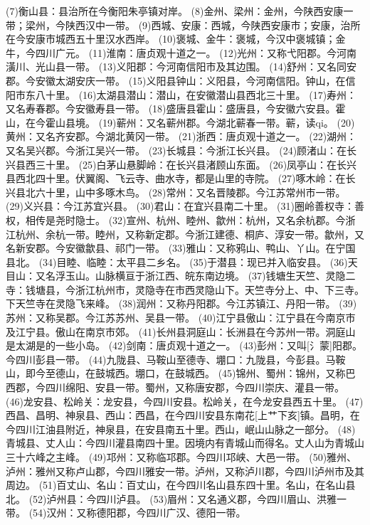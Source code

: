 \documentclass[12pt,UTF8]{ctexbook}
\begin{document}
(7)衡山县：县治所在今衡阳朱亭镇对岸。
(8)金州、梁州：金州，今陕西安康一带；梁州，今陕西汉中一带。
(9)西城、安康：西城，今陕西安康市；安康，治所在今安康市城西五十里汉水西岸。
(10)褒城、金牛：褒城，今汉中褒城镇；金牛，今四川广元。
(11)淮南：唐贞观十道之一。
(12)光州：又称弋阳郡。今河南潢川、光山县一带。
(13)义阳郡：今河南信阳市及其边围。
(14)舒州：又名同安郡。今安徽太湖安庆一带。
(15)义阳县钟山：义阳县，今河南信阳。钟山，在信阳市东八十里。
(16)太湖县潜山：潜山，在安徽潜山县西北三十里。
(17)寿州：又名寿春郡。今安徽寿县一带。
(18)盛唐县霍山：盛唐县，今安徽六安县。霍山，在今霍山县境。
(19)蕲州：又名蕲州郡。今湖北蕲春一带。蕲，读qi。
(20)黄州：又名齐安郡。今湖北黄冈一带。
(21)浙西：唐贞观十道之一。
(22)湖州：又名吴兴郡。今浙江吴兴一带。
(23)长城县：今浙江长兴县。
(24)顾渚山：在长兴县西三十里。
(25)白茅山悬脚岭：在长兴县渚顾山东面。
(26)凤亭山：在长兴县西北四十里。伏翼阁、飞云寺、曲水寺，都是山里的寺院。
(27)啄木岭：在长兴县北六十里，山中多啄木鸟。
(28)常州：又名晋陵郡。今江苏常州市一带。
(29)义兴县：今江苏宜兴县。
(30)君山：在宜兴县南二十里。
(31)圈岭善权寺：善权，相传是尧时隐士。
(32)宣州、杭州、睦州、歙州：杭州，又名余杭郡。今浙江杭州、余杭一带。睦州，又称新定郡。今浙江建德、桐庐、淳安一带。歙州，又名新安郡。今安徽歙县、祁门一带。
(33)雅山：又称鸦山、鸭山、丫山。在宁国县北。
(34)目睦、临睦：太平县二乡名。
(35)于潜县：现已并入临安县。
(36)天目山：又名浮玉山。山脉横亘于浙江西、皖东南边境。
(37)钱塘生天竺、灵隐二寺：钱塘县，今浙江杭州市，灵隐寺在市西灵隐山下。天竺寺分上、中、下三寺。下天竺寺在灵隐飞来峰。
(38)润州：又称丹阳郡。今江苏镇江、丹阳一带。
(39)苏州：又称吴郡。今江苏苏州、吴县一带。
(40)江宁县傲山：江宁县在今南京市及江宁县。傲山在南京市郊。
(41)长州县洞庭山：长洲县在今苏州一带。洞庭山是太湖是的一些小岛。
(42)剑南：唐贞观十道之一。
(43)彭州：又叫[氵蒙]阳郡。今四川彭县一带。
(44)九陇县、马鞍山至德寺、堋口：九陇县，今彭县。马鞍山，即今至德山，在鼓城西。堋口，在鼓城西。
(45)锦州、蜀州：锦州，又称巴西郡，今四川绵阳、安县一带。蜀州，又称唐安郡，今四川崇庆、灌县一带。
(46)龙安县、松岭关：龙安县，今四川安县。松岭关，在今龙安县西五十里。
(47)西昌、昌明、神泉县、西山：西昌，在今四川安县东南花[上艹下亥]镇。昌明，在今四川江油县附近，神泉县，在安县南五十里。西山，岷山山脉之一部分。 
(48)青城县、丈人山：今四川灌县南四十里。因境内有青城山而得名。丈人山为青城山三十六峰之主峰。
(49)邛州：又称临邛郡。今四川邛峡、大邑一带。
(50)雅州、泸州：雅州又称卢山郡，今四川雅安一带。泸州，又称泸川郡，今四川泸州市及其周边。
(51)百丈山、名山：百丈山，在今四川名山县东四十里。名山，在名山县北。
(52)泸州县：今四川泸县。
(53)眉州：又名通义郡，今四川眉山、洪雅一带。
(54)汉州：又称德阳郡，今四川广汉、德阳一带。
\end{document}
